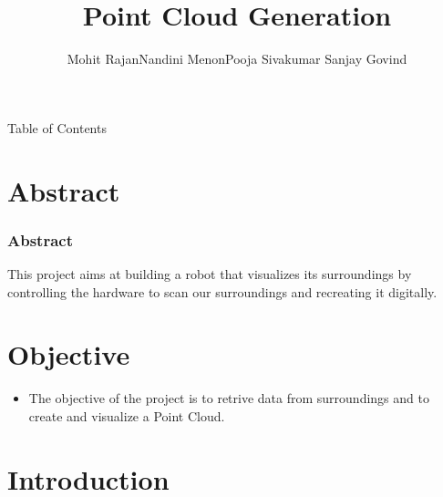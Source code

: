 \documentclass{beamer}
\title[Design Project]{Point Cloud Generation}
\author{Mohit Rajan\newline Nandini Menon\newline Pooja Sivakumar   \newline Sanjay Govind}
\institute[FISAT] %
{
FISAT \\ %
\medskip
}
\begin{document}
\begin{frame}
\titlepage %
\end{frame}

\begin{frame}{Table of Contents}
\tableofcontents
\newpage
\end{frame}


\section{Abstract} %

\begin{frame}
\frametitle{Abstract}
\par This project aims at building a robot that visualizes its surroundings by controlling the hardware to scan our surroundings and recreating it digitally.
\end{frame}

\section{Objective}
\begin{frame}
\begin{itemize}
\item The objective of the project is to retrive data from surroundings and to create and visualize a Point Cloud.
\end{itemize}
\end{frame}



\section{Introduction}
\end{document}
